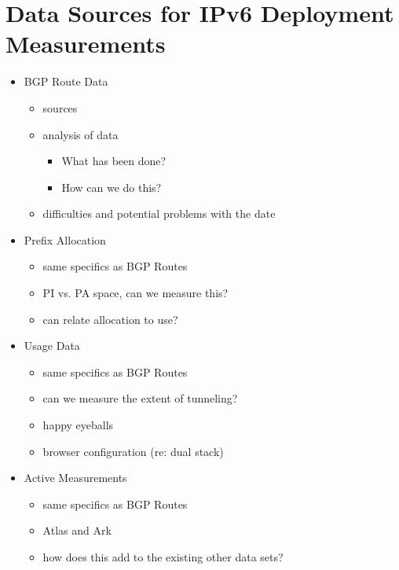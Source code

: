 \section{Data Sources for IPv6 Deployment Measurements}

\begin{itemize}
    \item BGP Route Data
    \begin{itemize}
        \item sources
        \item analysis of data
        \begin{itemize}
            \item What has been done?
            \item How can we do this?
        \end{itemize}
        \item difficulties and potential problems with the date
    \end{itemize}
    \item Prefix Allocation
    \begin{itemize}
        \item same specifics as BGP Routes
        \item PI vs. PA space, can we measure this?
        \item can relate allocation to use?
    \end{itemize}
    \item Usage Data
    \begin{itemize}
        \item same specifics as BGP Routes
        \item can we measure the extent of tunneling?
        \item happy eyeballs
        \item browser configuration (re: dual stack)
    \end{itemize}
    \item Active Measurements
    \begin{itemize}
        \item same specifics as BGP Routes
        \item Atlas and Ark
        \item how does this add to the existing other data sets?
    \end{itemize}
\end{itemize}
